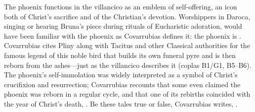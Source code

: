 The phoenix functions in the villancico as an emblem of self-offering, an icon
both of Christ's sacrifice and of the Christian's devotion.
Worshippers in Daroca, singing or hearing Bruna's piece during rituals of
Eucharistic adoration, would have been familiar with the phoenix as Covarrubias
defines it: the phoenix is .%
    \Autocite[400, ]{Covarrubias:Tesoro}
Covarrubias cites Pliny along with Tacitus and other Classical authorities for
the famous legend of this noble bird that builds its own funeral pyre and is
then reborn from the ashes---just as the villancico describes it (coplas B1/G1,
B5--B6).
The phoenix's self-immolation was widely interpreted as a symbol of Christ's
crucifixion and resurrection; Covarrubias recounts that some even claimed the
phoenix was reborn in a regular cycle, and that one of its rebirths coincided
with the year of Christ's death, .
Be these tales true or false, Covarrubias writes, .%
    \Autocite[400, ]{Covarrubias:Tesoro}


